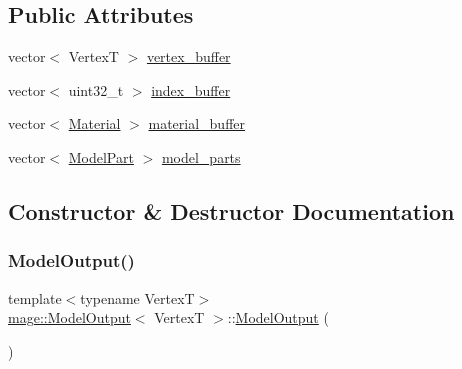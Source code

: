 \subsection*{Public Attributes}
\begin{DoxyCompactItemize}
\item 
vector$<$ VertexT $>$ \hyperlink{structmage_1_1_model_output_a8180bf5262d435a394936d50f056c4a3}{vertex\+\_\+buffer}
\item 
vector$<$ uint32\+\_\+t $>$ \hyperlink{structmage_1_1_model_output_a0c49359544b7d3c961118caa629f6405}{index\+\_\+buffer}
\item 
vector$<$ \hyperlink{structmage_1_1_material}{Material} $>$ \hyperlink{structmage_1_1_model_output_a66764a4d8c7e5b099e51013f385f13bf}{material\+\_\+buffer}
\item 
vector$<$ \hyperlink{structmage_1_1_model_part}{Model\+Part} $>$ \hyperlink{structmage_1_1_model_output_ac101de6237d4de379f7f85bbdf71dc46}{model\+\_\+parts}
\end{DoxyCompactItemize}


\subsection{Constructor \& Destructor Documentation}
\hypertarget{structmage_1_1_model_output_a7d64b57d8207968541eb9c6da6ef0163}{}\label{structmage_1_1_model_output_a7d64b57d8207968541eb9c6da6ef0163} 
\subsubsection{\texorpdfstring{Model\+Output()}{ModelOutput()}\hspace{0.1cm}{\footnotesize\ttfamily [1/3]}}
{\footnotesize\ttfamily template$<$typename VertexT$>$ \\
\hyperlink{structmage_1_1_model_output}{mage\+::\+Model\+Output}$<$ VertexT $>$\+::\hyperlink{structmage_1_1_model_output}{Model\+Output} (\begin{DoxyParamCaption}{ }\end{DoxyParamCaption})\hspace{0.3cm}{\ttfamily [default]}}

\hypertarget{structmage_1_1_model_output_aac808e40a66f33da4ea28ebb7443623d}{}\label{structmage_1_1_model_output_aac808e40a66f33da4ea28ebb7443623d} 
